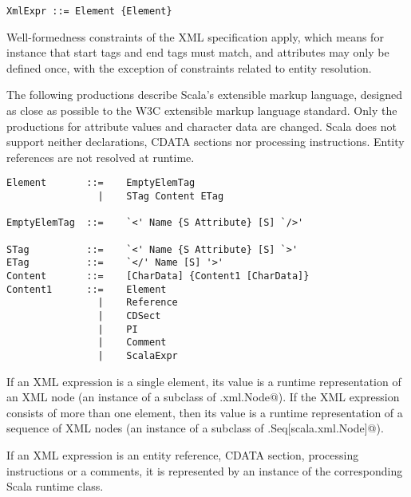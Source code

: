 \syntax\begin{lstlisting}
XmlExpr ::= Element {Element}
\end{lstlisting}
Well-formedness constraints of the XML specification apply, which
means for instance that start tags and end tags must match, and
attributes may only be defined once, with the exception of constraints
related to entity resolution.

The following productions describe Scala's extensible markup language,
designed as close as possible to the W3C extensible markup language
standard. Only the productions for attribute values and character data
are changed. Scala does not support neither declarations, CDATA
sections nor processing instructions. Entity references are not
resolved at runtime.

\syntax\begin{lstlisting}
Element       ::=    EmptyElemTag
                |    STag Content ETag                                       

EmptyElemTag  ::=    `<' Name {S Attribute} [S] `/>'                         

STag          ::=    `<' Name {S Attribute} [S] `>'                          
ETag          ::=    `</' Name [S] '>'                                        
Content       ::=    [CharData] {Content1 [CharData]}
Content1      ::=    Element
                |    Reference
                |    CDSect
                |    PI
                |    Comment
                |    ScalaExpr
\end{lstlisting}

If an XML expression is a single element, its value is a runtime
representation of an XML node (an instance of a subclass of 
\lstinline@scala.xml.Node@). If the XML expression consists of more
than one element, then its value is a runtime representation of a
sequence of XML nodes (an instance of a subclass of 
\lstinline@scala.Seq[scala.xml.Node]@).

If an XML expression is an entity reference, CDATA section, processing 
instructions or a comments, it is represented by an instance of the 
corresponding Scala runtime class.

